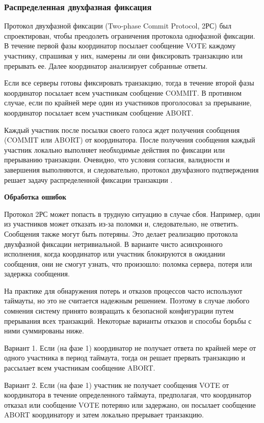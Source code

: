 \subsubsection{Распределенная двухфазная фиксация}

Протокол двухфазной фиксации (Two-phase Commit Protocol, 2РС) был спроектирован, чтобы преодолеть ограничения протокола
однофазной фиксации. В течение первой фазы координатор посылает сообщение VOTE каждому участнику, спрашивая у них, намерены 
ли они фиксировать транзакцию или прерывать ее. Далее координатор анализирует собранные ответы.

Если все серверы готовы фиксировать транзакцию, тогда в течение второй фазы координатор посылает всем участникам сообщение COMMIT. 
В противном случае, если по крайней мере один из участников проголосовал за прерывание, координатор посылает всем участникам сообщение ABORT.

Каждый участник после посылки своего голоса ждет получения сообщения (COMMIT или ABORT) от координатора. После получения сообщения каждый 
участник локально выполняет необходимые действия по фиксации или прерыванию транзакции. Очевидно, что условия согласия, валидности и 
завершения выполняются, и следовательно, протокол двухфазного подтверждения решает задачу распределенной фиксации транзакции \autocite{Fix}.

\textbf{Обработка ошибок}

Протокол 2РС может попасть в трудную ситуацию в случае сбоя. Например, один из участников может отказать из-за поломки и, следовательно, не ответить. 
Сообщения также могут быть потеряны. Это делает реализацию протокола двухфазной фиксации нетривиальной. В варианте чисто асинхронного исполнения, 
когда координатор или участник блокируются в ожидании сообщения, они не смогут узнать, что произошло: поломка сервера, потеря или задержка сообщения. 

На практике для обнаружения потерь и отказов процессов часто используют таймауты, но это не считается надежным решением. Поэтому в случае любого сомнения 
систему принято возвращать к безопасной конфигурации путем прерывания всех транзакций. Некоторые варианты отказов и способы борьбы с ними суммированы ниже.

Вариант 1. Если (на фазе 1) координатор не получает ответа по крайней мере от одного участника в период таймаута, тогда он решает прервать транзакцию и 
рассылает всем участникам сообщение ABORT.

Вариант 2. Если (на фазе 1) участник не получает сообщения VOTE от координатора в течение определенного таймаута, предполагая, что координатор отказал или 
сообщение VOTE потеряно или задержано, он посылает сообщение ABORT координатору и затем локально прерывает транзакцию.

